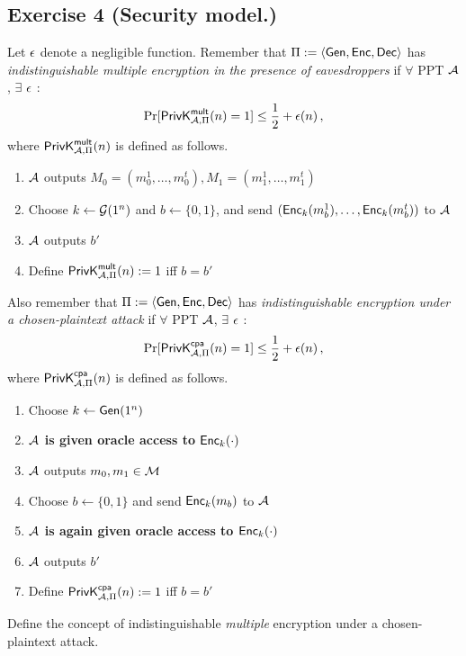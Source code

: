\subsection{Exercise 4 (Security model.)}
Let $\epsilon$ denote a negligible function.
Remember that $\Pi:=\langle \operatorname{\mathsf{Gen}}, \operatorname{\mathsf{Enc}}, \operatorname{\mathsf{Dec}} \rangle$ has \emph{indistinguishable
multiple encryption in the presence of eavesdroppers} if $\forall$
PPT $\mathcal{A}$, $\exists$ $\epsilon$ :
  $$\Pr[\mathsf{PrivK}_{\mathcal{A},\Pi}^\mathsf{mult}(n)=1]\leq\frac12+\epsilon(n) \,,$$
where $\mathsf{PrivK}_{\mathcal{A},\Pi}^\mathsf{mult}(n)$ is defined as follows.
%
\smallskip
\begin{enumerate}
\item   $\mathcal{A}$ outputs $M_0=(m_0^1,\ldots,m_0^t),
M_1=(m_1^1,\ldots,m_1^t)$
\item Choose $k \leftarrow \mathcal{G}(1^n)$ and $b \leftarrow \{0,1\}$, and send
  $(\operatorname{\mathsf{Enc}}_k(m_b^1),\ldots,\operatorname{\mathsf{Enc}}_k(m_b^t))$ to $\mathcal{A}$
\item $\mathcal{A}$ outputs $b'$
\item Define $\mathsf{PrivK}_{\mathcal{A},\Pi}^\mathsf{mult}(n):=1$ iff $b=b'$
\end{enumerate}
%
\smallskip
Also remember that $\Pi:=\langle \operatorname{\mathsf{Gen}}, \operatorname{\mathsf{Enc}}, \operatorname{\mathsf{Dec}} \rangle$ has \emph{indistinguishable
encryption under a chosen-plaintext attack} if $\forall$ PPT $\mathcal{A}$,
$\exists$ $\epsilon$ :
  $$\Pr[\mathsf{PrivK}_{\mathcal{A},\Pi}^\mathsf{cpa}(n)=1]\leq\frac12+\epsilon(n) \,,$$
where $\mathsf{PrivK}_{\mathcal{A},\Pi}^\mathsf{cpa}(n)$ is defined as follows.
\smallskip
\begin{enumerate}
  \item Choose $k\leftarrow \operatorname{\mathsf{Gen}}(1^n)$
  \item \textbf{$\mathcal{A}$ is given oracle access to $\operatorname{\mathsf{Enc}}_k(\cdot)$}
  \item $\mathcal{A}$ outputs $m_0, m_1 \in \mathcal{M}$
  \item Choose $b\leftarrow\{0,1\}$ and send $\operatorname{\mathsf{Enc}}_k(m_b)$ to $\mathcal{A}$
  \item \textbf{$\mathcal{A}$ is again given oracle access to $\operatorname{\mathsf{Enc}}_k(\cdot)$}
  \item $\mathcal{A}$ outputs $b'$
  \item Define $\mathsf{PrivK}_{\mathcal{A},\Pi}^\mathsf{cpa}(n):=1$ iff $b=b'$
\end{enumerate}
\smallskip

Define the concept of indistinguishable \emph{multiple} encryption under a chosen-plaintext attack.

